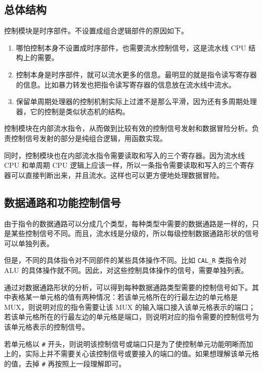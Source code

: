 \documentclass[12pt,AutoFakeBold,AutoFakeSlant]{article}
\providecommand{\tightlist}{%
  \setlength{\itemsep}{0pt}\setlength{\parskip}{0pt}}
\begin{document}
\hypertarget{ux603bux4f53ux7ed3ux6784}{%
\subsection{总体结构}\label{ux603bux4f53ux7ed3ux6784}}

控制模块是时序部件。不设置成组合逻辑部件的原因如下。

\begin{enumerate}
\def\labelenumi{\arabic{enumi}.}
\tightlist
\item
  哪怕控制本身不设置成时序部件，也需要流水控制信号，这是流水线 CPU
  结构上的需要。
\item
  控制本身是时序部件，就可以流水更多的信息。最明显的就是指令读写寄存器的信息。比如暴力转发也把指令读写寄存器的信息放在流水线中流水。
\item
  保留单周期处理器的控制机制实际上过渡不是那么平滑，因为还有多周期处理器，它的控制是类似状态机的结构。
\end{enumerate}

控制模块在内部流水指令，从而做到比较有效的控制信号发射和数据冒险分析。负责控制信号发射的部分是纯组合逻辑，用函数实现。

同时，控制模块也在内部流水指令需要读取和写入的三个寄存器。因为流水线 CPU
和单周期 CPU
逻辑上应该一样，所以一条指令需要读取和写入的三个寄存器可以直接判断出来，并且流水。这样也可以更方便地处理数据冒险。

\hypertarget{ux6570ux636eux901aux8defux548cux529fux80fdux63a7ux5236ux4fe1ux53f7}{%
\subsection{数据通路和功能控制信号}\label{ux6570ux636eux901aux8defux548cux529fux80fdux63a7ux5236ux4fe1ux53f7}}

由于指令的数据通路可以分成几个类型，每种类型中需要的数据通路是一样的，只是某些控制信号不同。而且，流水线是分级的，所以每级控制数据通路形状的信号可以单独列表。

但是，不同的具体指令对不同部件的某些具体操作不同。比如 \texttt{CAL\_R}
类指令对 ALU
的具体操作就不同。因此，对这些控制具体操作的信号，需要单独列表。

通过对数据通路形状的分析，可以得到每种数据通路类型需要的控制信号如下。其中表格某一单元格的值有两种情况：若该单元格所在的行最左边的单元格是
MUX，则说明对应的指令需要让该 MUX
的输入端口接入该单元格表示的端口；若该单元格所在的行最左边的单元格是端口，则说明对应的指令需要的控制信号为该单元格表示的控制信号。

若单元格以 \texttt{\#}
开头，则说明该控制信号或端口只是为了使控制单元功能明晰而加上的，实际上并不需要关心该控制信号或要接入的端口的值。如果想理解该单元格的值，去掉
\texttt{\#} 再按照上一段理解即可。
\end{document}

